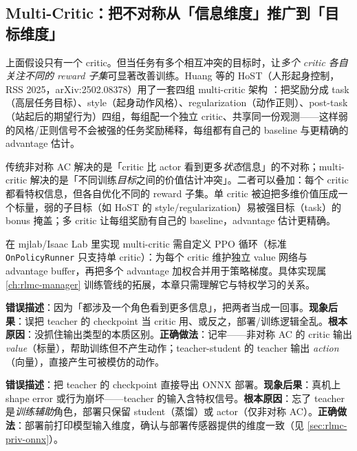 \subsection{Multi-Critic：把不对称从「信息维度」推广到「目标维度」}
\label{sec:rlmc-priv-multicritic}

上面假设只有一个 critic。但当任务有多个相互冲突的目标时，让\emph{多个 critic 各自关注不同的 reward 子集}可显著改善训练。Huang 等的 HoST（人形起身控制，RSS 2025，arXiv:2502.08378）用了一套四组 multi-critic 架构 \cite{huang2025host}：把奖励分成 task（高层任务目标）、style（起身动作风格）、regularization（动作正则）、post-task（站起后的期望行为）四组，每组配一个独立 critic、共享同一份观测——这样弱的风格/正则信号不会被强的任务奖励稀释，每组都有自己的 baseline 与更精确的 advantage 估计。

\begin{insight}\label{ins:rlmc-priv-multic}
传统非对称 AC 解决的是「critic 比 actor 看到更多\emph{状态}信息」的不对称；multi-critic 解决的是「不同训练\emph{目标}之间的价值估计冲突」。二者可以叠加：每个 critic 都看特权信息，但各自优化不同的 reward 子集。单 critic 被迫把多维价值压成一个标量，弱的子目标（如 HoST 的 style/regularization）易被强目标（task）的 bonus 掩盖；多 critic 让每组奖励有自己的 baseline，advantage 估计更精确。
\end{insight}

在 mjlab/Isaac Lab 里实现 multi-critic 需自定义 PPO 循环（标准 \verb|OnPolicyRunner| 只支持单 critic）：为每个 critic 维护独立 value 网络与 advantage buffer，再把多个 advantage 加权合并用于策略梯度。具体实现属 \cref{ch:rlmc-manager} 训练管线的拓展，本章只需理解它与特权学习的关系。

\begin{pitfall}
\textbf{错误描述}：因为「都涉及一个角色看到更多信息」，把两者当成一回事。\textbf{现象后果}：误把 teacher 的 checkpoint 当 critic 用、或反之，部署/训练逻辑全乱。\textbf{根本原因}：没抓住输出类型的本质区别。\textbf{正确做法}：记牢——非对称 AC 的 critic 输出 \emph{value}（标量），帮助训练但不产生动作；teacher-student 的 teacher 输出 \emph{action}（向量），直接产生可被模仿的动作。
\end{pitfall}

\begin{pitfall}
\textbf{错误描述}：把 teacher 的 checkpoint 直接导出 ONNX 部署。\textbf{现象后果}：真机上 shape error 或行为崩坏——teacher 的输入含特权信号。\textbf{根本原因}：忘了 teacher 是\emph{训练辅助}角色，部署只保留 student（蒸馏）或 actor（仅非对称 AC）。\textbf{正确做法}：部署前打印模型输入维度，确认与部署传感器提供的维度一致（见 \cref{sec:rlmc-priv-onnx}）。
\end{pitfall}

